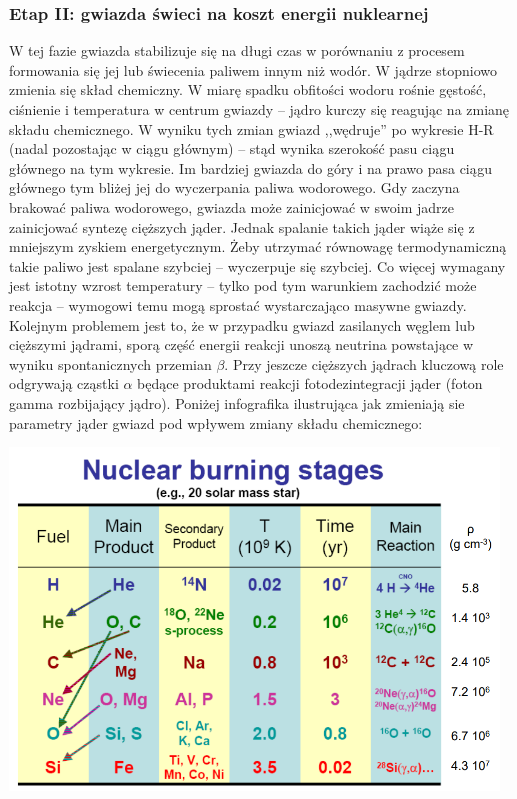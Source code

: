 \documentclass[../index.tex]{subfiles}
\begin{document}
            \subsubsection{Etap II: gwiazda świeci na koszt energii nuklearnej}
                W tej fazie gwiazda stabilizuje się na długi czas w porównaniu z procesem formowania się jej lub świecenia paliwem innym niż wodór. W jądrze stopniowo zmienia się skład chemiczny. W miarę spadku obfitości wodoru rośnie gęstość, ciśnienie i temperatura w centrum gwiazdy – jądro kurczy się reagując na zmianę składu chemicznego. W wyniku tych zmian gwiazd ,,wędruje'' po wykresie H-R (nadal pozostając w ciągu głównym) – stąd wynika szerokość pasu ciągu głównego na tym wykresie. Im bardziej gwiazda do góry i na prawo pasa ciągu głównego tym bliżej jej do wyczerpania paliwa wodorowego. Gdy zaczyna brakować paliwa wodorowego, gwiazda może zainicjować w swoim jadrze zainicjować syntezę cięższych jąder. Jednak spalanie takich jąder wiąże się z mniejszym zyskiem energetycznym. Żeby utrzymać równowagę termodynamiczną takie paliwo jest spalane szybciej – wyczerpuje się szybciej. Co więcej wymagany jest istotny wzrost temperatury – tylko pod tym warunkiem zachodzić może reakcja – wymogowi temu mogą sprostać wystarczająco masywne gwiazdy. Kolejnym problemem jest to, że w przypadku gwiazd zasilanych węglem lub cięższymi jądrami, sporą część energii reakcji unoszą neutrina powstające w wyniku spontanicznych przemian \(\beta\). Przy jeszcze cięższych jądrach kluczową role odgrywają cząstki \(\alpha\) będące produktami reakcji fotodezintegracji jąder (foton gamma rozbijający jądro). Poniżej infografika ilustrująca jak zmieniają sie parametry jąder gwiazd pod wpływem zmiany składu chemicznego:
                \begin{center}
                    \includegraphics[width=13cm]{images/skladJadroGwiazda.png}
                \end{center}
\end{document}
